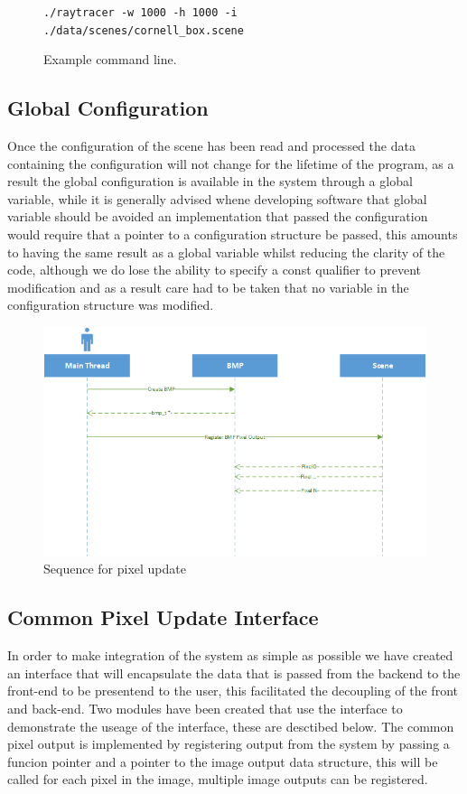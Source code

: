 \begin{figure}[h]
\texttt{./raytracer -w 1000 -h 1000 -i ./data/scenes/cornell\_box.scene}
\caption{Example command line.}
\end{figure}

\subsection{Global Configuration}
Once the configuration of the scene has been read and processed the data containing the configuration will not change for
the lifetime of the program, as a result the global configuration is available in the system through a global variable, while
it is generally advised whene developing software that global variable should be avoided an implementation that passed the
configuration would require that a pointer to a configuration structure be passed, this amounts to having the same result
as a global variable whilst reducing the clarity of the code, although we do lose the ability to specify a const qualifier
to prevent modification and as a result care had to be taken that no variable in the configuration structure was modified.

\begin{figure}
\centering
\includegraphics[width=\textwidth]{./images/pixel_update_sequence.png}
\caption{Sequence for pixel update}
\end{figure}

\subsection{Common Pixel Update Interface}
In order to make integration of the system as simple as possible we have created an interface that will encapsulate the data
that is passed from the backend to the front-end to be presentend to the user, this facilitated the decoupling of the front
and back-end. Two modules have been created that use the interface to demonstrate the useage of the interface, these are
desctibed below. The common pixel output is implemented by registering output from the system by passing a funcion pointer
and a pointer to the image output data structure, this will be called for each pixel in the image, multiple image outputs
can be registered.

